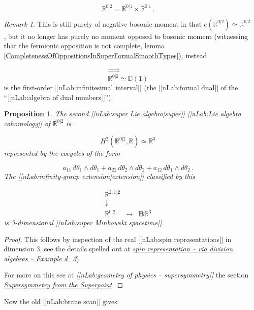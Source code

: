 \documentclass[12pt,titlepage]{article}
\newcommand{\itexarray}[1]{\begin{matrix}#1\end{matrix}}
\theoremstyle{plain}
\newtheorem{prop}{Proposition}
\theoremstyle{definition}
\theoremstyle{remark}
\newtheorem{remark}{Remark}
\begin{document}
\begin{displaymath}
\mathbb{R}^{0|2}
  =
  \mathbb{R}^{0|1}\times \mathbb{R}^{0|1}
  \,.
\end{displaymath}
\begin{remark}
\label{}\hypertarget{}{}
This is still purely of negative bosonic moment in that $e(\mathbb{R}^{0|2}) \simeq \mathbb{R}^{0|2}$, but it no longer has purely no moment opposed to bosonic moment (witnessing that the fermionic opposition is not complete, lemma \ref{CompletenessOfOppositionsInSuperFormalSmoothTypes}), instead

\begin{displaymath}
\stackrel{\rightrightarrows}{\mathbb{R}^{0|2}}
  \simeq
  \mathbb{D}(1)
\end{displaymath}
is the first-order [[nLab:infinitesimal interval]] (the [[nLab:formal dual]] of the ``[[nLab:algebra of dual numbers]]'').

\end{remark}
\begin{prop}
\label{3dSuperMinkowskiSpacetime}\hypertarget{3dSuperMinkowskiSpacetime}{}
The second [[nLab:super Lie algebra|super]] [[nLab:Lie algebra cohomology]] of $\mathbb{R}^{0\vert 2}$ is

\begin{displaymath}
H^2(\mathbb{R}^{0\vert 2}, \mathbb{R})
  \simeq
  \mathbb{R}^3
\end{displaymath}
represented by the cocycles of the form

\begin{displaymath}
a_{11}
  \,
  d\theta_1 \wedge d\theta_1
   +
  a_{22}
  \,
  d\theta_2 \wedge d\theta_2
  +
  a_{12}
  \,
  d\theta_1 \wedge d\theta_2
  \,.
\end{displaymath}
The [[nLab:infinity-group extension|extension]] classified by this

\begin{displaymath}
\itexarray{
     \mathbb{R}^{2,1|\mathbf{2}}
     \\
     \downarrow
     \\
     \mathbb{R}^{0|2}
     &\stackrel{}{\longrightarrow}&
     \mathbf{B} \mathbb{R}^3
  }
\end{displaymath}
is 3-dimensional [[nLab:super Minkowski spacetime]].

\end{prop}
\begin{proof}
This follows by inspection of the real [[nLab:spin representations]] in dimension 3, see the details spelled out at \emph{\href{http://ncatlab.org/nlab/show/spin%20representation#RealSpinorRepsIn3d}{spin representation -- via division algebras -- Example d=3}}).

For more on this see at \emph{[[nLab:geometry of physics -- supersymmetry]]} the section \emph{\href{https://ncatlab.org/nlab/show/geometry+of+physics+--+supersymmetry#SupersymmetryFromTheSuperpoint}{Supersymmetry from the Superpoint}}.

\end{proof}
Now the old [[nLab:brane scan]] gives:
\end{document}
